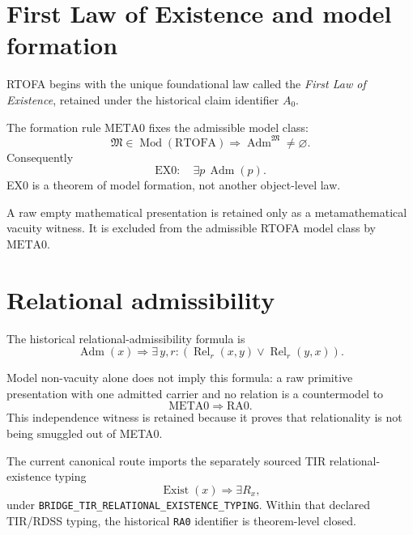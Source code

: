\documentclass[11pt]{article}
\newcommand{\claimid}[1]{\nolinkurl{#1}}
\begin{document}
\section{First Law of Existence and model formation}

RTOFA begins with the unique foundational law called the \emph{First Law of
Existence}, retained under the historical claim identifier \(A_0\).

\begin{center}
\end{center}

The formation rule \(\mathrm{META0}\) fixes the admissible model class:
\[
\boxed{
\mathfrak M\in\operatorname{Mod}(\mathrm{RTOFA})
\Longrightarrow
\operatorname{Adm}^{\mathfrak M}\neq\varnothing.
}
\]
Consequently
\[
\boxed{
\mathrm{EX0}:\quad
\exists p\,\operatorname{Adm}(p).
}
\]
EX0 is a theorem of model formation, not another object-level law.

A raw empty mathematical presentation is retained only as a metamathematical
vacuity witness. It is excluded from the admissible RTOFA model class by
\(\mathrm{META0}\).

\section{Relational admissibility}

The historical relational-admissibility formula is
\[
\boxed{
\operatorname{Adm}(x)
\Longrightarrow
\exists\,y,r:
\left(
\operatorname{Rel}_{r}(x,y)
\lor
\operatorname{Rel}_{r}(y,x)
\right).
}
\tag{RA0}
\]

Model non-vacuity alone does not imply this formula: a raw primitive
presentation with one admitted carrier and no relation is a countermodel to
\[
\mathrm{META0}\Rightarrow\mathrm{RA0}.
\]
This independence witness is retained because it proves that relationality is
not being smuggled out of META0.

The current canonical route imports the separately sourced TIR
relational-existence typing
\[
\boxed{
\operatorname{Exist}(x)
\Longrightarrow
\exists R_x,
}
\]
under
\claimid{BRIDGE_TIR_RELATIONAL_EXISTENCE_TYPING}.
Within that declared TIR/RDSS typing, the historical
\claimid{RA0} identifier is theorem-level closed.
\end{document}
